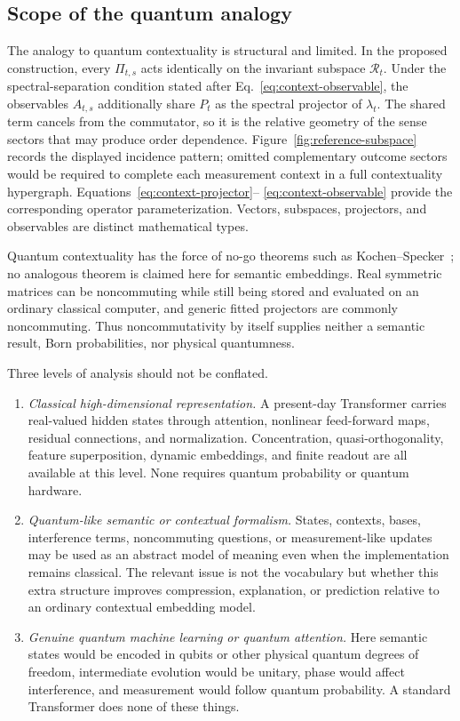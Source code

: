 \documentclass[
  aps,
  reprint,
  superscriptaddress,
  floatfix,
  nofootinbib,
  longbibliography
]{revtex4-2}
\begin{document}
\subsection{Scope of the quantum analogy}
\label{sec:quantum}

The analogy to quantum contextuality is structural and limited.  In the
proposed construction, every $\Pi_{t,s}$ acts identically on the invariant
subspace $\mathcal R_t$.  Under the spectral-separation condition stated after
Eq.~\eqref{eq:context-observable}, the observables $A_{t,s}$ additionally share
$P_t$ as the spectral projector of $\lambda_t$.  The shared term cancels from
the commutator, so it is the relative geometry of the sense sectors that may
produce order dependence.  Figure~\ref{fig:reference-subspace}
records the displayed incidence pattern; omitted complementary outcome sectors
would be required to complete each measurement context in a full contextuality
hypergraph.  Equations~\eqref{eq:context-projector}--
\eqref{eq:context-observable} provide the corresponding operator
parameterization.  Vectors, subspaces, projectors, and observables are distinct
mathematical types.

Quantum contextuality has the force of no-go theorems such as
Kochen--Specker~\cite{specker-60,kochen1}; no analogous theorem is claimed
here for semantic embeddings.  Real symmetric matrices can be noncommuting
while still being stored and evaluated on an ordinary classical computer, and
generic fitted projectors are commonly noncommuting.  Thus noncommutativity by
itself supplies neither a semantic result, Born probabilities, nor physical
quantumness.

Three levels of analysis should not be conflated.
%
\begin{enumerate}
\item \emph{Classical high-dimensional representation.}
A present-day Transformer carries real-valued hidden states through
attention, nonlinear feed-forward maps, residual connections, and
normalization.  Concentration, quasi-orthogonality, feature superposition,
dynamic embeddings, and finite readout are all available at this level.
None requires quantum probability or quantum hardware.

\item \emph{Quantum-like semantic or contextual formalism.}
States, contexts, bases, interference terms, noncommuting questions, or
measurement-like updates may be used as an abstract model of meaning even
when the implementation remains classical.  The relevant issue is not the
vocabulary but whether this extra structure improves compression,
explanation, or prediction relative to an ordinary contextual embedding
model.

\item \emph{Genuine quantum machine learning or quantum attention.}
Here semantic states would be encoded in qubits or other physical quantum
degrees of freedom, intermediate evolution would be unitary, phase would
affect interference, and measurement would follow quantum probability.  A
standard Transformer does none of these things.
\end{enumerate}
%
\end{document}
